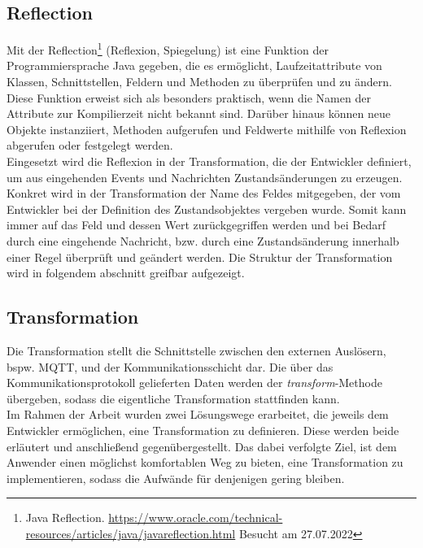 \subsection{Reflection} 
\label{subsec:reflection}
    Mit der Reflection\footnote{Java Reflection. \url{https://www.oracle.com/technical-resources/articles/java/javareflection.html} Besucht am 27.07.2022} 
    (Reflexion, Spiegelung) ist eine Funktion der Programmiersprache Java gegeben, die es ermöglicht, Laufzeitattribute von Klassen, Schnittstellen, Feldern 
    und Methoden zu überprüfen und zu ändern. Diese Funktion erweist sich als besonders praktisch, wenn die Namen der Attribute zur Kompilierzeit nicht bekannt sind. 
    Darüber hinaus können neue Objekte instanziiert, Methoden aufgerufen und Feldwerte mithilfe von Reflexion abgerufen oder festgelegt werden. 
    \\
    \linebreak
    Eingesetzt wird die Reflexion in der Transformation, die der Entwickler definiert, um aus eingehenden Events und Nachrichten Zustandsänderungen zu erzeugen. Konkret wird in der 
    Transformation der Name des Feldes mitgegeben, der vom Entwickler bei der Definition des Zustandsobjektes vergeben wurde. Somit kann immer auf das Feld und dessen Wert zurückgegriffen werden und bei Bedarf durch eine eingehende Nachricht, bzw. durch eine Zustandsänderung innerhalb einer Regel überprüft und geändert werden. Die Struktur der 
    Transformation wird in folgendem abschnitt greifbar aufgezeigt.

\subsection{Transformation}
\label{subsec:transformation}
    Die Transformation stellt die Schnittstelle zwischen den externen Auslösern, bspw. \acs{MQTT}, und der Kommunikationsschicht dar. 
    Die über das Kommunikationsprotokoll gelieferten Daten werden der \textit{transform}-Methode übergeben, sodass die eigentliche 
    Transformation stattfinden kann. %
    \\
    \linebreak
    Im Rahmen der Arbeit wurden zwei Lösungswege erarbeitet, die jeweils dem Entwickler ermöglichen, eine Transformation zu definieren. Diese werden beide 
    erläutert und anschließend gegenübergestellt. Das dabei verfolgte Ziel, ist dem Anwender einen möglichst komfortablen Weg zu bieten, eine 
    Transformation zu implementieren, sodass die Aufwände für denjenigen gering bleiben.
